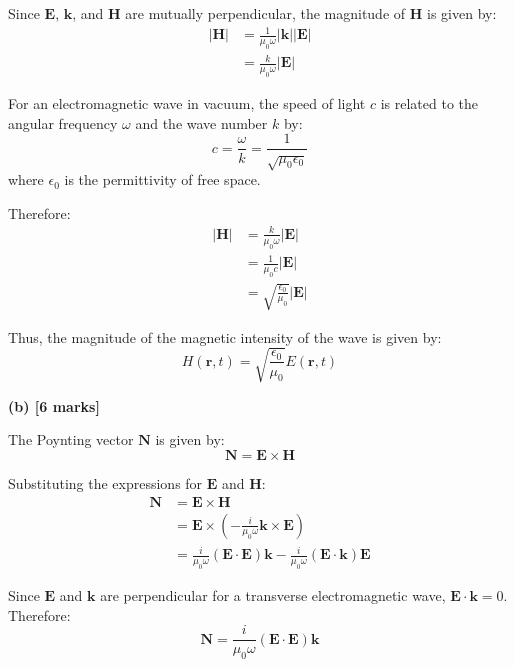 \documentclass{article}
\begin{document}
Since $\mathbf{E}$, $\mathbf{k}$, and $\mathbf{H}$ are mutually perpendicular, the magnitude of $\mathbf{H}$ is given by:
\begin{align*}
|\mathbf{H}| &= \frac{1}{\mu_0 \omega} |\mathbf{k}| |\mathbf{E}| \\
&= \frac{k}{\mu_0 \omega} |\mathbf{E}|
\end{align*}

For an electromagnetic wave in vacuum, the speed of light $c$ is related to the angular frequency $\omega$ and the wave number $k$ by:
\begin{equation*}
c = \frac{\omega}{k} = \frac{1}{\sqrt{\mu_0 \epsilon_0}}
\end{equation*}
where $\epsilon_0$ is the permittivity of free space.

Therefore:
\begin{align*}
|\mathbf{H}| &= \frac{k}{\mu_0 \omega} |\mathbf{E}| \\
&= \frac{1}{\mu_0 c} |\mathbf{E}| \\
&= \sqrt{\frac{\epsilon_0}{\mu_0}} |\mathbf{E}|
\end{align*}

Thus, the magnitude of the magnetic intensity of the wave is given by:
\begin{equation*}
H(\mathbf{r}, t) = \sqrt{\frac{\epsilon_0}{\mu_0}} E(\mathbf{r}, t)
\end{equation*}

\textbf{(b) [6 marks]}

The Poynting vector $\mathbf{N}$ is given by:
\begin{equation*}
\mathbf{N} = \mathbf{E} \times \mathbf{H}
\end{equation*}

Substituting the expressions for $\mathbf{E}$ and $\mathbf{H}$:
\begin{align*}
\mathbf{N} &= \mathbf{E} \times \mathbf{H} \\
&= \mathbf{E} \times \left( -\frac{i}{\mu_0 \omega} \mathbf{k} \times \mathbf{E} \right) \\
&= \frac{i}{\mu_0 \omega} (\mathbf{E} \cdot \mathbf{E}) \mathbf{k} - \frac{i}{\mu_0 \omega} (\mathbf{E} \cdot \mathbf{k}) \mathbf{E}
\end{align*}

Since $\mathbf{E}$ and $\mathbf{k}$ are perpendicular for a transverse electromagnetic wave, $\mathbf{E} \cdot \mathbf{k} = 0$. Therefore:
\begin{equation*}
\mathbf{N} = \frac{i}{\mu_0 \omega} (\mathbf{E} \cdot \mathbf{E}) \mathbf{k}
\end{equation*}
\end{document}
